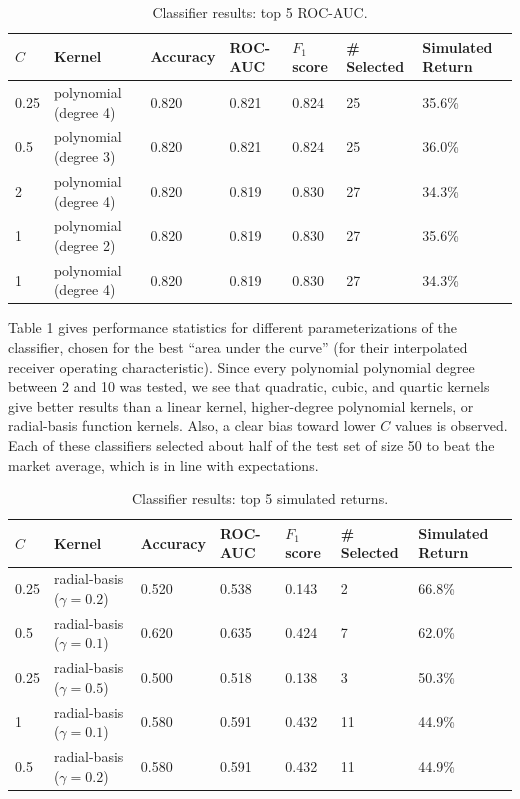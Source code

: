 \documentclass[format=acmlarge]{acmart}
\begin{document}
\begin{table}
  \caption{Classifier results: top 5 ROC-AUC.}
  \label{tab:one}
  \begin{tabular}{ll|lll|ll}
    $C$ & Kernel & Accuracy & ROC-AUC & $F_1$ score & \# Selected & Simulated Return\\
    \hline
    0.25 & polynomial (degree 4) & 0.820 & 0.821 & 0.824 & 25 & 35.6\%\\
    0.5 & polynomial (degree 3) & 0.820 & 0.821 & 0.824 & 25 & 36.0\%\\
    2 & polynomial (degree 4) & 0.820 & 0.819 & 0.830 & 27 & 34.3\%\\
    1 & polynomial (degree 2) & 0.820 & 0.819 & 0.830 & 27 & 35.6\%\\
    1 & polynomial (degree 4) & 0.820 & 0.819 & 0.830 & 27 & 34.3\%\\
  \end{tabular}
\end{table}

Table 1 gives performance statistics for different parameterizations of the classifier, chosen for the best ``area under the curve'' (for their interpolated receiver operating characteristic).  Since every polynomial polynomial degree between 2 and 10 was tested, we see that quadratic, cubic, and quartic kernels give better results than a linear kernel, higher-degree polynomial kernels, or radial-basis function kernels.  Also, a clear bias toward lower $C$ values is observed.  Each of these classifiers selected about half of the test set of size 50 to beat the market average, which is in line with expectations.

\begin{table}
  \caption{Classifier results: top 5 simulated returns.}
  \label{tab:two}
  \begin{tabular}{ll|lll|ll}
    $C$ & Kernel & Accuracy & ROC-AUC & $F_1$ score & \# Selected & Simulated Return\\
    \hline
    0.25 & radial-basis ($\gamma = 0.2$) & 0.520 & 0.538 & 0.143 & 2 & 66.8\%\\
    0.5 & radial-basis ($\gamma = 0.1$) & 0.620 & 0.635 & 0.424 & 7 & 62.0\%\\
    0.25 & radial-basis ($\gamma = 0.5$) & 0.500 & 0.518 & 0.138 & 3 & 50.3\%\\
    1 & radial-basis ($\gamma = 0.1$) & 0.580 & 0.591 & 0.432 & 11 & 44.9\%\\
    0.5 & radial-basis ($\gamma = 0.2$)& 0.580 & 0.591 & 0.432 & 11 & 44.9\%\\
  \end{tabular}
\end{table}
\end{document}
